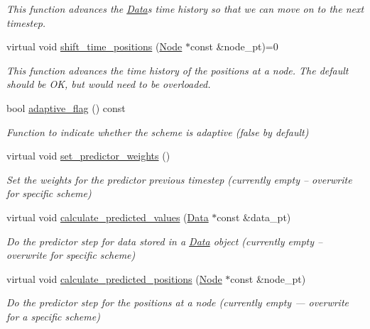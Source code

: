 \begin{DoxyCompactItemize}
\begin{DoxyCompactList}\small\item\em This function advances the \hyperlink{classoomph_1_1Data}{Data}\textquotesingle{}s time history so that we can move on to the next timestep. \end{DoxyCompactList}\item 
virtual void \hyperlink{classoomph_1_1TimeStepper_a518b1bee5dc3aae8c5ef13560d1954ac}{shift\+\_\+time\+\_\+positions} (\hyperlink{classoomph_1_1Node}{Node} $\ast$const \&node\+\_\+pt)=0
\begin{DoxyCompactList}\small\item\em This function advances the time history of the positions at a node. The default should be OK, but would need to be overloaded. \end{DoxyCompactList}\item 
bool \hyperlink{classoomph_1_1TimeStepper_a6168cca9a2a3c7bfd50c8797aed72d2d}{adaptive\+\_\+flag} () const
\begin{DoxyCompactList}\small\item\em Function to indicate whether the scheme is adaptive (false by default) \end{DoxyCompactList}\item 
virtual void \hyperlink{classoomph_1_1TimeStepper_a2dfb949155ba433066fd69dc427ba1ce}{set\+\_\+predictor\+\_\+weights} ()
\begin{DoxyCompactList}\small\item\em Set the weights for the predictor previous timestep (currently empty -- overwrite for specific scheme) \end{DoxyCompactList}\item 
virtual void \hyperlink{classoomph_1_1TimeStepper_a159d508b1ae643fe31b55da9ee789dbf}{calculate\+\_\+predicted\+\_\+values} (\hyperlink{classoomph_1_1Data}{Data} $\ast$const \&data\+\_\+pt)
\begin{DoxyCompactList}\small\item\em Do the predictor step for data stored in a \hyperlink{classoomph_1_1Data}{Data} object (currently empty -- overwrite for specific scheme) \end{DoxyCompactList}\item 
virtual void \hyperlink{classoomph_1_1TimeStepper_a2e7fafceb9330ac971078cf9dc248701}{calculate\+\_\+predicted\+\_\+positions} (\hyperlink{classoomph_1_1Node}{Node} $\ast$const \&node\+\_\+pt)
\begin{DoxyCompactList}\small\item\em Do the predictor step for the positions at a node (currently empty --- overwrite for a specific scheme) \end{DoxyCompactList}\item 

\end{DoxyCompactItemize}
